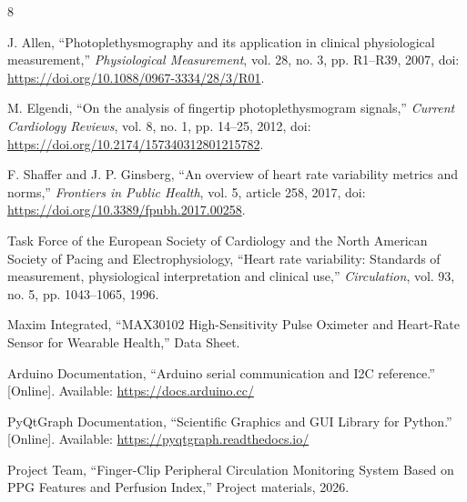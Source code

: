 \documentclass[10pt,conference]{IEEEtran}
\begin{document}
\begin{thebibliography}{8}

J. Allen, ``Photoplethysmography and its application in clinical physiological measurement,'' \textit{Physiological Measurement}, vol. 28, no. 3, pp. R1--R39, 2007, doi: \url{https://doi.org/10.1088/0967-3334/28/3/R01}.

M. Elgendi, ``On the analysis of fingertip photoplethysmogram signals,'' \textit{Current Cardiology Reviews}, vol. 8, no. 1, pp. 14--25, 2012, doi: \url{https://doi.org/10.2174/157340312801215782}.

F. Shaffer and J. P. Ginsberg, ``An overview of heart rate variability metrics and norms,'' \textit{Frontiers in Public Health}, vol. 5, article 258, 2017, doi: \url{https://doi.org/10.3389/fpubh.2017.00258}.

Task Force of the European Society of Cardiology and the North American Society of Pacing and Electrophysiology, ``Heart rate variability: Standards of measurement, physiological interpretation and clinical use,'' \textit{Circulation}, vol. 93, no. 5, pp. 1043--1065, 1996.

Maxim Integrated, ``MAX30102 High-Sensitivity Pulse Oximeter and Heart-Rate Sensor for Wearable Health,'' Data Sheet.

Arduino Documentation, ``Arduino serial communication and I2C reference.'' [Online]. Available: \url{https://docs.arduino.cc/}

PyQtGraph Documentation, ``Scientific Graphics and GUI Library for Python.'' [Online]. Available: \url{https://pyqtgraph.readthedocs.io/}

Project Team, ``Finger-Clip Peripheral Circulation Monitoring System Based on PPG Features and Perfusion Index,'' Project materials, 2026.

\end{thebibliography}
\end{document}
